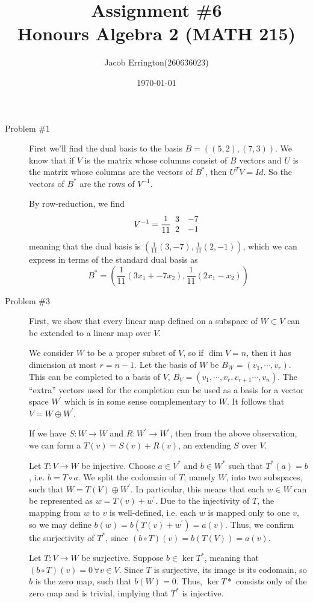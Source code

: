 \documentclass{article}
\author{Jacob Errington(260636023)}
\title{Assignment \#6\\Honours Algebra 2 (MATH 215)}
\date{\today}
\begin{document}
\maketitle

\begin{description}

    \item[Problem \#1] 
        First we'll find the dual basis to the basis $B = ((5, 2), (7, 3))$. We know
        that if $V$ is the matrix whose columns consist of $B$ vectors and $U$ is the
        matrix whose columns are the vectors of $B^*$, then $U^T V = Id$. So the
        vectors of $B^*$ are the rows of $V^{-1}$.

        By row-reduction, we find 
        $$V^{-1} = 
        \frac{1}{11}
        \begin{array}{c c}
            3 & -7 \\
            2 & -1
        \end{array}
        $$
        meaning that the dual basis is $(\frac{1}{11}(3, -7), \frac{1}{11}(2, -1))$, 
        which we can express in terms of the standard dual basis as
        $$
        B^* = (\frac{1}{11}(3x_1 + -7x_2), \frac{1}{11}(2x_1 - x_2))
        $$

    \item[Problem \#3]
        First, we show that every linear map defined on a subspace of $W \subset V$ can
        be extended to a linear map over $V$.

        We consider $W$ to be a proper subset of $V$, so if $\dim V = n$, then it has
        dimension at most $r = n-1$. Let the basis of $W$ be $B_W = (v_1, \cdots,
        v_r)$. This can be completed to a basis of $V$, 
        $B_V = (v_1, \cdots, v_r, v_{r+1} \cdots, v_n)$. The ``extra'' vectors used for
        the completion can be used as a basis for a vector space $W^\prime$ which is in
        some sense complementary to $W$. It follows that $V = W \oplus W^\prime$.

        If we have $S : W \to W$ and $R : W^\prime \to W^\prime$, then from the above
        observation, we can form a $T(v) = S(v) + R(v)$, an extending $S$ over $V$.

        Let $T: V \to W$ be injective. Choose $a \in V^*$ and $b \in W^*$ such that
        $T^*(a) = b$, i.e. $b = T \circ a$. We split the codomain of $T$, namely $W$,
        into two subspaces, such that $W = T(V) \oplus W^\prime$. In particular, this
        means that each $w \in W$ can be represented as $w = T(v) + w^\prime$. Due to
        the injectivity of $T$, the mapping from $w$ to $v$ is well-defined, i.e. each
        $w$ is mapped only to one $v$, so we may define 
        $b(w) = b(T(v) + w^\prime) = a(v)$. Thus, we confirm the surjectivity of $T^*$,
        since $(b \circ T)(v) = b(T(V)) = a(v)$.

        Let $T : V \to W$ be surjective. Suppose $b \in \ker {T^*}$,
        meaning that $(b \circ T)(v) = 0\, \forall v \in V$. Since $T$ is surjective,
        its image is its codomain, so $b$ is the zero map, such that $b(W) = 0$. Thus,
        $\ker{T*}$ consists only of the zero map and is trivial, implying that $T^*$ is
        injective.
\end{description}
\end{document}
